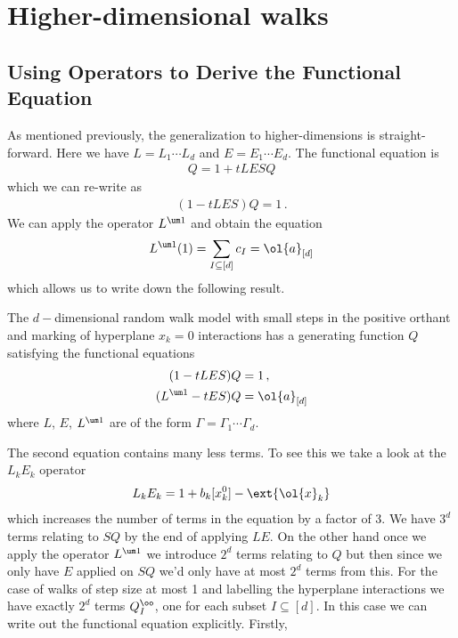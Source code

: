 
\chapter{Higher-dimensional walks}

\section{Using Operators to Derive the Functional Equation}

As mentioned previously, the generalization to higher-dimensions is straight-forward. Here we have  $L = L_1\cdots L_d$ and $E = E_1\cdots E_d$. The functional equation is
\begin{align}
	Q = 1 + tLESQ
\end{align}
which we can re-write as
\begin{align}
	(1-tLES)Q = 1\,.
\end{align}
We can apply the operator $L^{\um 1}$ and obtain the equation
\begin{align}
	L^{\um 1}(1) = \sum_{I\subseteq [d]}c_I = \ol{a}_{[d]}
\end{align}
which allows us to write down the following result.
\begin{prop} The $d-$dimensional random walk model with small steps in the positive orthant and marking of hyperplane $x_k=0$ interactions has a generating function $Q$ satisfying the functional equations
\begin{align}
	(1-tLES)Q &= 1\,,\\
	(L^{\um 1}-tES)Q &= \ol{a}_{[d]}
\end{align}
where $L$, $E$, $L^{\um 1}$ are of the form $\Gamma = \Gamma_1\cdots \Gamma_d$.
\end{prop}
The second equation contains many less terms. To see this we take a look at the $L_kE_k$ operator
\begin{align}
	L_kE_k = 1 + b_k[x_k^0]-\ext{\ol{x}_k}
\end{align}
which increases the number of terms in the equation by a factor of 3. We have $3^d$ terms relating to $SQ$ by the end of applying $LE$. On the other hand once we apply the operator $L^{\um 1}$ we introduce $2^d$ terms relating to $Q$ but then since we only have $E$ applied on $SQ$ we'd only have at most $2^d$ terms from this. For the case of walks of step size at most 1 and labelling the hyperplane interactions we have exactly $2^d$ terms $Q_{I}^\oo$, one for each subset $I \subseteq [d]$. In this case we can write out the functional equation explicitly. Firstly,
